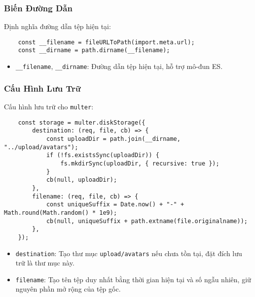             \subsubsection{Biến Đường Dẫn}
                \hspace*{0.6cm}Định nghĩa đường dẫn tệp hiện tại:
                \begin{lstlisting}
    const __filename = fileURLToPath(import.meta.url);
    const __dirname = path.dirname(__filename);
                \end{lstlisting}
                \begin{itemize}
                    \item \texttt{\_\_filename}, \texttt{\_\_dirname}: Đường dẫn tệp hiện tại, hỗ trợ mô-đun ES.
                \end{itemize}

            \subsubsection{Cấu Hình Lưu Trữ}
                \hspace*{0.6cm}Cấu hình lưu trữ cho \texttt{multer}:
                \begin{lstlisting}
    const storage = multer.diskStorage({
        destination: (req, file, cb) => {
            const uploadDir = path.join(__dirname, "../upload/avatars");
            if (!fs.existsSync(uploadDir)) {
                fs.mkdirSync(uploadDir, { recursive: true });
            }
            cb(null, uploadDir);
        },
        filename: (req, file, cb) => {
            const uniqueSuffix = Date.now() + "-" + Math.round(Math.random() * 1e9);
            cb(null, uniqueSuffix + path.extname(file.originalname));
        },
    });
                \end{lstlisting}
                \begin{itemize}
                    \item \texttt{destination}: Tạo thư mục \texttt{upload/avatars} nếu chưa tồn tại, đặt đích lưu trữ là thư mục này.
                    \item \texttt{filename}: Tạo tên tệp duy nhất bằng thời gian hiện tại và số ngẫu nhiên, giữ nguyên phần mở rộng của tệp gốc.
                \end{itemize}

